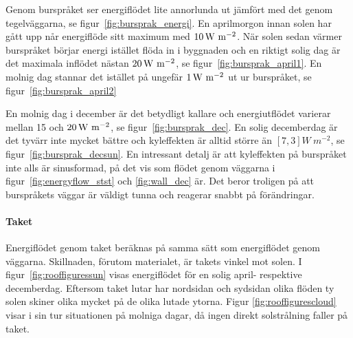 Genom burspråket ser energiflödet lite annorlunda ut jämfört med det genom tegelväggarna, se figur~\ref{fig:bursprak_energi}. En aprilmorgon innan solen har gått upp når energiflöde sitt maximum med $\unit[10]{W~m^{-2}}$. När solen sedan värmer burspråket börjar energi istället flöda in i byggnaden och en riktigt solig dag är det maximala inflödet nästan $\unit[20]{W~m^{-2}}$, se figur~\ref{fig:bursprak_april1}. En molnig dag stannar det istället på ungefär $\unit[1]{W~m^{-2}}$ ut ur burspråket, se figur~\ref{fig:bursprak_april2}

En molnig dag i december är det betydligt kallare och energiutflödet varierar mellan 15 och $\unit[20]{W~m^{-2}}$, se figur~\ref{fig:bursprak_dec}. En solig decemberdag är det tyvärr inte mycket bättre och kyleffekten är alltid större än $[7,3]\unit{W~m^{-2}}$, se figur~\ref{fig:bursprak_decsun}.
 En intressant detalj är att kyleffekten på burspråket inte alls är sinusformad, på det vis som flödet genom väggarna i figur~\ref{fig:energyflow_stst} och \ref{fig:wall_dec} är. Det beror troligen på att burspråkets väggar är väldigt tunna och reagerar snabbt på förändringar.

\paragraph{Taket}

Energiflödet genom taket beräknas på samma sätt som energiflödet genom väggarna. Skillnaden, förutom materialet, är takets vinkel mot solen. I figur~\ref{fig:rooffiguressun} visas energiflödet för en solig april- respektive decemberdag. Eftersom taket lutar har nordsidan och sydsidan olika flöden ty solen skiner olika mycket på de olika lutade ytorna. Figur \ref{fig:rooffigurescloud} visar i sin tur situationen på molniga dagar, då ingen direkt solstrålning faller på taket.



